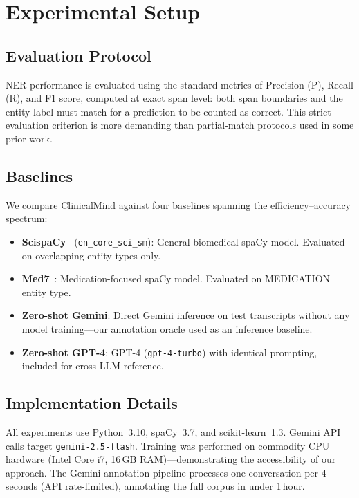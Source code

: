 \documentclass[conference]{IEEEtran}
\begin{document}
\section{Experimental Setup}
\label{sec:setup}

\subsection{Evaluation Protocol}

NER performance is evaluated using the standard metrics of Precision (P),
Recall (R), and F1 score, computed at exact span level: both span boundaries
and the entity label must match for a prediction to be counted as correct.
This strict evaluation criterion is more demanding than partial-match
protocols used in some prior work.

\subsection{Baselines}

We compare ClinicalMind against four baselines spanning the
efficiency–accuracy spectrum:

\begin{itemize}
  \item \textbf{ScispaCy}~\cite{neumann2019scispacy} (\texttt{en\_core\_sci\_sm}):
  General biomedical spaCy model. Evaluated on overlapping entity types only.
  \item \textbf{Med7}~\cite{kormilitzin2021med7}: Medication-focused spaCy
  model. Evaluated on MEDICATION entity type.
  \item \textbf{Zero-shot Gemini}: Direct Gemini inference on test transcripts
  without any model training—our annotation oracle used as an inference
  baseline.
  \item \textbf{Zero-shot GPT-4}: GPT-4 (\texttt{gpt-4-turbo}) with identical
  prompting, included for cross-LLM reference.
\end{itemize}

\subsection{Implementation Details}

All experiments use Python~3.10, spaCy~3.7, and scikit-learn~1.3.
Gemini API calls target \texttt{gemini-2.5-flash}. Training was performed
on commodity CPU hardware (Intel Core i7, 16\,GB RAM)—demonstrating the
accessibility of our approach. The Gemini annotation pipeline processes one
conversation per 4\,seconds (API rate-limited), annotating the full corpus in
under 1\,hour.
\end{document}

